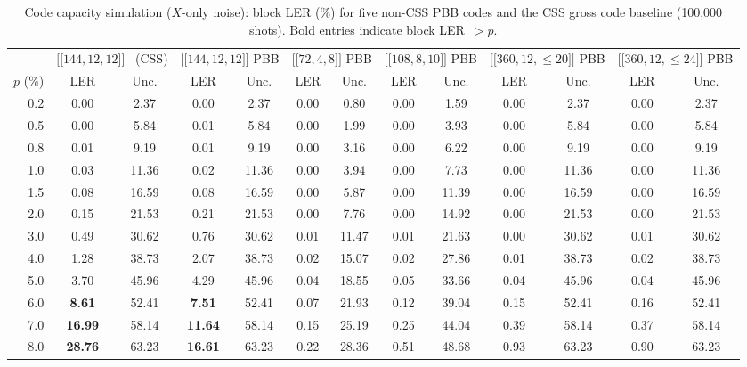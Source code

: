 \documentclass[aps,prxquantum,twocolumn,superscriptaddress,nofootinbib]{revtex4-2}
\newcommand{\dblbrk}[1]{\ensuremath{\lbrack\!\lbrack #1 \rbrack\!\rbrack}}
\newcommand{\code}[1]{\dblbrk{#1}}
\begin{document}
\begin{table}[t]
\centering
\caption{Code capacity simulation ($X$-only noise): block LER (\%) for five non-CSS PBB codes and the CSS gross code baseline (100{,}000 shots).
Bold entries indicate block LER~$> p$.}
\label{tab:threshold_noncss_full}
\small
\setlength{\tabcolsep}{3pt}
\begin{tabular}{r|cc|cc|cc|cc|cc|cc}
\toprule
& \multicolumn{2}{c|}{$\code{144,12,12}$~\cite{bravyi2024high} (CSS)} & \multicolumn{2}{c|}{$\code{144,12,12}$ PBB} & \multicolumn{2}{c|}{$\code{72,4,8}$ PBB} & \multicolumn{2}{c|}{$\code{108,8,10}$ PBB} & \multicolumn{2}{c|}{$\code{360,12,{\leq}20}$ PBB} & \multicolumn{2}{c}{$\code{360,12,{\leq}24}$ PBB} \\
$p$ (\%) & LER & Unc. & LER & Unc. & LER & Unc. & LER & Unc. & LER & Unc. & LER & Unc. \\
\midrule
0.2 & 0.00 & 2.37 & 0.00 & 2.37 & 0.00 & 0.80 & 0.00 & 1.59 & 0.00 & 2.37 & 0.00 & 2.37 \\
0.5 & 0.00 & 5.84 & 0.01 & 5.84 & 0.00 & 1.99 & 0.00 & 3.93 & 0.00 & 5.84 & 0.00 & 5.84 \\
0.8 & 0.01 & 9.19 & 0.01 & 9.19 & 0.00 & 3.16 & 0.00 & 6.22 & 0.00 & 9.19 & 0.00 & 9.19 \\
1.0 & 0.03 & 11.36 & 0.02 & 11.36 & 0.00 & 3.94 & 0.00 & 7.73 & 0.00 & 11.36 & 0.00 & 11.36 \\
1.5 & 0.08 & 16.59 & 0.08 & 16.59 & 0.00 & 5.87 & 0.00 & 11.39 & 0.00 & 16.59 & 0.00 & 16.59 \\
2.0 & 0.15 & 21.53 & 0.21 & 21.53 & 0.00 & 7.76 & 0.00 & 14.92 & 0.00 & 21.53 & 0.00 & 21.53 \\
3.0 & 0.49 & 30.62 & 0.76 & 30.62 & 0.01 & 11.47 & 0.01 & 21.63 & 0.00 & 30.62 & 0.01 & 30.62 \\
4.0 & 1.28 & 38.73 & 2.07 & 38.73 & 0.02 & 15.07 & 0.02 & 27.86 & 0.01 & 38.73 & 0.02 & 38.73 \\
5.0 & 3.70 & 45.96 & 4.29 & 45.96 & 0.04 & 18.55 & 0.05 & 33.66 & 0.04 & 45.96 & 0.04 & 45.96 \\
6.0 & \textbf{8.61} & 52.41 & \textbf{7.51} & 52.41 & 0.07 & 21.93 & 0.12 & 39.04 & 0.15 & 52.41 & 0.16 & 52.41 \\
7.0 & \textbf{16.99} & 58.14 & \textbf{11.64} & 58.14 & 0.15 & 25.19 & 0.25 & 44.04 & 0.39 & 58.14 & 0.37 & 58.14 \\
8.0 & \textbf{28.76} & 63.23 & \textbf{16.61} & 63.23 & 0.22 & 28.36 & 0.51 & 48.68 & 0.93 & 63.23 & 0.90 & 63.23 \\
\bottomrule
\end{tabular}
\end{table}
\end{document}
